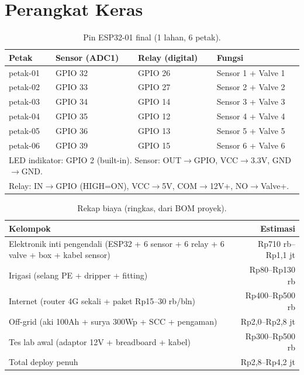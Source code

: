 \documentclass[12pt,a4paper,oneside]{report}
\begin{document}
\section{Perangkat Keras}
\begin{table}[h]
\centering
\caption{Pin ESP32-01 final (1 lahan, 6 petak).}
\begin{tabular}{llll}
\toprule
Petak & Sensor (ADC1) & Relay (digital) & Fungsi \\
\midrule
petak-01 & GPIO 32 & GPIO 26 & Sensor 1 + Valve 1 \\
petak-02 & GPIO 33 & GPIO 27 & Sensor 2 + Valve 2 \\
petak-03 & GPIO 34 & GPIO 14 & Sensor 3 + Valve 3 \\
petak-04 & GPIO 35 & GPIO 12 & Sensor 4 + Valve 4 \\
petak-05 & GPIO 36 & GPIO 13 & Sensor 5 + Valve 5 \\
petak-06 & GPIO 39 & GPIO 15 & Sensor 6 + Valve 6 \\
\midrule
\multicolumn{4}{l}{LED indikator: GPIO 2 (built-in). Sensor: OUT$\rightarrow$GPIO, VCC$\rightarrow$3.3V, GND$\rightarrow$GND.} \\
\multicolumn{4}{l}{Relay: IN$\rightarrow$GPIO (HIGH=ON), VCC$\rightarrow$5V, COM$\rightarrow$12V+, NO$\rightarrow$Valve+.} \\
\bottomrule
\end{tabular}
\end{table}

\begin{table}[h]
\centering
\caption{Rekap biaya (ringkas, dari BOM proyek).}
\begin{tabularx}{\textwidth}{Xr}
\toprule
Kelompok & Estimasi \\
\midrule
Elektronik inti pengendali (ESP32 + 6 sensor + 6 relay + 6 valve + box + kabel sensor) & Rp710 rb--Rp1,1 jt \\
Irigasi (selang PE + dripper + fitting) & Rp80--Rp130 rb \\
Internet (router 4G sekali + paket Rp15--30 rb/bln) & Rp400--Rp500 rb \\
Off-grid (aki 100Ah + surya 300Wp + SCC + pengaman) & Rp2,0--Rp2,8 jt \\
Tes lab awal (adaptor 12V + breadboard + kabel) & Rp300--Rp500 rb \\
\midrule
Total deploy penuh & Rp2,8--Rp4,2 jt \\
\bottomrule
\end{tabularx}
\end{table}
\end{document}

